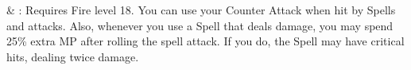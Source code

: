 \begin{tabjob}
     & %
    : Requires Fire level 18. You can use your Counter Attack when hit by Spells and  attacks. Also, whenever you use a Spell that deals damage, you may spend 25\% extra MP after rolling the spell attack. If you do, the Spell may have critical hits, dealing twice damage. \\
\end{tabjob}
\clearpage